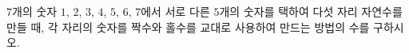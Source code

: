 $7$개의 숫자 $1$, $2$, $3$, $4$, $5$, $6$, $7$에서 서로 다른 $5$개의 숫자를 택하여 다섯 자리 자연수를 만들 때, 각 자리의 숫자를 짝수와 홀수를 교대로 사용하여 만드는 방법의 수를 구하시오.

